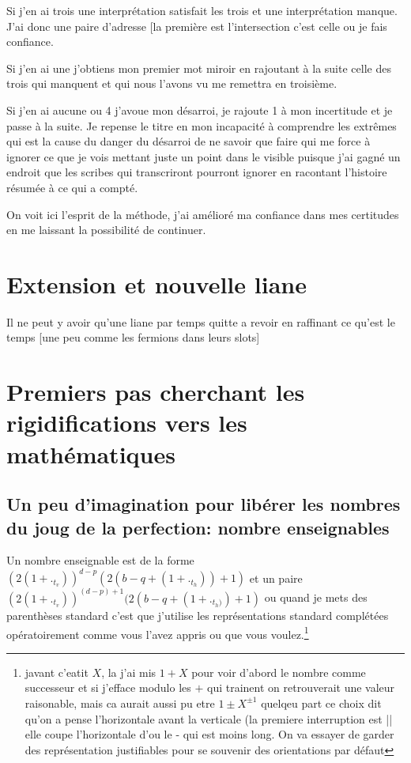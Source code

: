 \documentclass{article}
\begin{document}
Si j'en ai trois une interprétation satisfait les trois et une interprétation manque. J'ai donc une paire d'adresse [la première est l'intersection c'est celle ou je fais confiance.

Si j'en ai une j'obtiens mon premier mot miroir en rajoutant à la suite celle des trois qui manquent et qui nous l'avons vu me remettra en troisième.


Si j'en ai aucune ou 4 j'avoue mon désarroi, je rajoute 1 à mon incertitude et je passe à la suite. Je repense le titre en mon incapacité à comprendre les extrêmes qui est la cause du danger du désarroi de ne savoir que faire qui me force à ignorer ce que je vois mettant juste un point dans le visible puisque j'ai gagné un endroit que les scribes qui transcriront pourront ignorer en racontant l'histoire résumée à ce qui a compté.

On voit ici l'esprit de la méthode, j'ai amélioré ma confiance dans mes certitudes en me laissant la possibilité de continuer.
  
\section{Extension et nouvelle liane}

Il ne peut y avoir qu'une liane par temps quitte a revoir en raffinant ce qu'est le temps [une peu comme les fermions dans leurs slots]

\section{Premiers pas cherchant les rigidifications vers les mathématiques}
\subsection{Un  peu d'imagination pour libérer les nombres du joug de la perfection: nombre enseignables}



Un nombre enseignable  est de la forme $(2(1+._{t_v}))^{d-p}(2(b-q+(1+._{t_h}))+1)$ et un paire $(2(1+._{t_v}))^{(d-p)+1}(2(b-q+(1+._{t_h)})+1)$ ou  quand je mets des parenthèses standard c'est que j'utilise les représentations standard complétées opératoirement comme vous l'avez appris ou que vous voulez.\footnote{javant c'eatit $X$, la j'ai mis $1+X$ pour voir d'abord le nombre comme successeur et si j'efface modulo les $+$ qui trainent on retrouverait une valeur raisonable,   mais ca aurait aussi  pu etre $1\pm X^{\pm 1}$ quelqeu part ce choix dit qu'on a pense l'horizontale avant la verticale (la premiere interruption est || elle coupe l'horizontale d'ou le - qui est moins long. On va essayer de garder des représentation justifiables pour se souvenir  des orientations par défaut}
\end{document}
